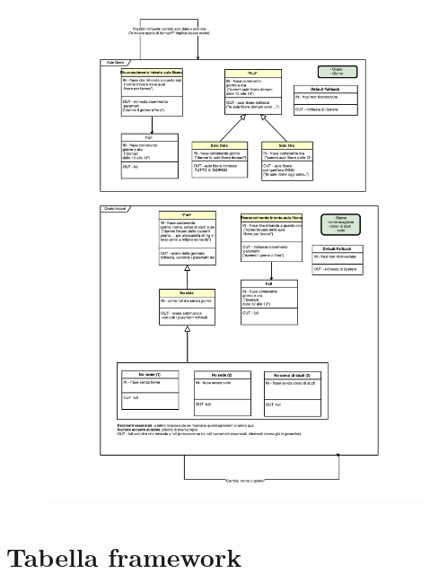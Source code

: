 \documentclass[]{article}
\begin{document}
\begin{figure}[hbtp]
\vspace*{-3cm} 
\hspace*{-3cm}
\includegraphics[width=1.6\textwidth]{p04}
\end{figure}

\pagebreak
\section{Tabella framework}
\end{document}
